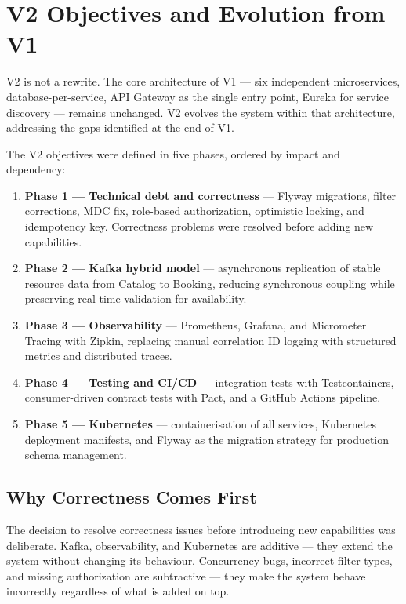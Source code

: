 \section{V2 Objectives and Evolution from V1}

V2 is not a rewrite. The core architecture of V1 --- six independent microservices, database-per-service, API Gateway as the single entry point, Eureka for service discovery --- remains unchanged. V2 evolves the system within that architecture, addressing the gaps identified at the end of V1.

The V2 objectives were defined in five phases, ordered by impact and dependency:

\begin{enumerate}
    \item \textbf{Phase 1 --- Technical debt and correctness} --- Flyway migrations, filter corrections, MDC fix, role-based authorization, optimistic locking, and idempotency key. Correctness problems were resolved before adding new capabilities.
    \item \textbf{Phase 2 --- Kafka hybrid model} --- asynchronous replication of stable resource data from Catalog to Booking, reducing synchronous coupling while preserving real-time validation for availability.
    \item \textbf{Phase 3 --- Observability} --- Prometheus, Grafana, and Micrometer Tracing with Zipkin, replacing manual correlation ID logging with structured metrics and distributed traces.
    \item \textbf{Phase 4 --- Testing and CI/CD} --- integration tests with Testcontainers, consumer-driven contract tests with Pact, and a GitHub Actions pipeline.
    \item \textbf{Phase 5 --- Kubernetes} --- containerisation of all services, Kubernetes deployment manifests, and Flyway as the migration strategy for production schema management.
\end{enumerate}

\subsection{Why Correctness Comes First}

The decision to resolve correctness issues before introducing new capabilities was deliberate. Kafka, observability, and Kubernetes are additive --- they extend the system without changing its behaviour. Concurrency bugs, incorrect filter types, and missing authorization are subtractive --- they make the system behave incorrectly regardless of what is added on top.

